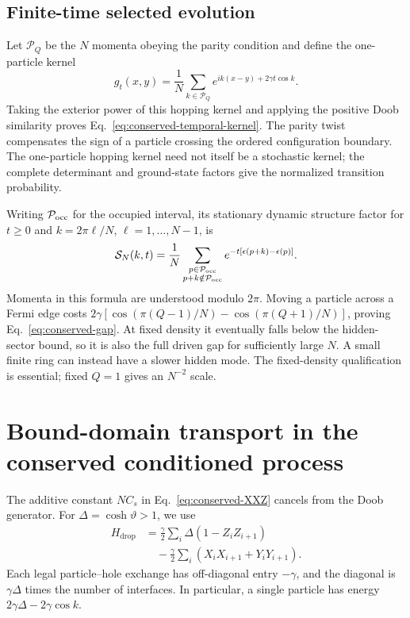 \documentclass[aps,pre,reprint,amsmath,amssymb,longbibliography,floatfix]{revtex4-2}
\begin{document}
\subsection{Finite-time selected evolution}
Let $\mathcal P_Q$ be the $N$ momenta obeying the parity condition and
define the one-particle kernel
\begin{equation}
 g_t(x,y)=\frac1N\sum_{k\in\mathcal P_Q}
 e^{ik(x-y)+2\gamma t\cos k}.
 \label{eq:conserved-oneparticle-kernel}
\end{equation}
Taking the exterior power of this hopping kernel and applying the
positive Doob similarity proves Eq.~\eqref{eq:conserved-temporal-kernel}.
The parity twist compensates the sign of a particle crossing the
ordered configuration boundary. The one-particle hopping kernel need
not itself be a stochastic kernel; the complete determinant and
ground-state factors give the normalized transition probability.

Writing $\mathcal P_{\rm occ}$ for the occupied interval, its stationary dynamic
structure factor for $t\geq0$ and $k=2\pi\ell/N$, $\ell=1,\ldots,N-1$, is
\begin{equation}
 \mathcal S_N(k,t)=\frac1N
 \sum_{\substack{p\in\mathcal P_{\rm occ}\\p+k\notin\mathcal P_{\rm occ}}}
 e^{-t\left[\epsilon(p+k)-\epsilon(p)\right]}.
\label{eq:conserved-dynamic-structure}
\end{equation}
Momenta in this formula are understood modulo $2\pi$.
Moving a particle across a Fermi edge costs
$2\gamma\left[\cos(\pi(Q-1)/N)-\cos(\pi(Q+1)/N)\right]$, proving
Eq.~\eqref{eq:conserved-gap}. At fixed density it eventually falls below
the hidden-sector bound, so it is also the full driven gap for
sufficiently large $N$. A small finite ring can instead have a slower
hidden mode. The fixed-density qualification is essential; fixed
$Q=1$ gives an $N^{-2}$ scale.

\section{Bound-domain transport in the conserved conditioned process}
\label{app:droplet-transport}

The additive constant $NC_s$ in Eq.~\eqref{eq:conserved-XXZ} cancels from
the Doob generator. For $\Delta=\cosh\vartheta>1$, we use
\begin{equation}
 \begin{aligned}
 H_{\mathrm{drop}}&=\frac\gamma2\sum_i\Delta(1-Z_iZ_{i+1})\\
 &\quad-\frac\gamma2\sum_i(X_iX_{i+1}+Y_iY_{i+1}).
 \end{aligned}
 \label{eq:droplet-normalization}
\end{equation}
Each legal particle--hole exchange has off-diagonal entry $-\gamma$,
and the diagonal is $\gamma\Delta$ times the number of interfaces.
In particular, a single particle has energy
$2\gamma\Delta-2\gamma\cos k$.
\end{document}

